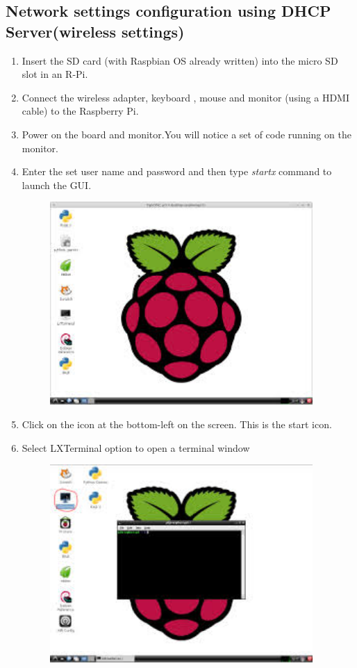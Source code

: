 \documentclass[11pt,a4paper]{report}
\begin{document}
\begin{flushleft}
	\subsection{Network settings configuration using DHCP Server(wireless settings)} 
	\begin{enumerate}
		\item Insert the SD card (with Raspbian OS already written) into the micro SD slot in an R-Pi.
		\item Connect the wireless adapter, keyboard , mouse and monitor (using a HDMI cable) to the Raspberry Pi.
		\item Power on the board and monitor.You will notice a set of code running on the monitor.
		\item Enter the set user name and password and then type \textit{startx} command to launch the GUI.
		\begin{figure}[h!]
			\includegraphics[width=10cm]{r1.jpg}
			\centering
			\caption{}
		\end{figure} 
		\item Click on the icon at the bottom-left on the screen. This is the start icon.
		\item Select LXTerminal option to open a terminal window
		\newpage
		\begin{figure}[h!]
			\includegraphics[width=10cm]{lxt.jpg}

\end{figure}
\end{enumerate}
\end{flushleft}
\end{document}
